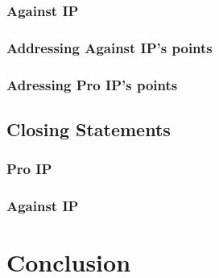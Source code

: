 \documentclass[a4paper]{report}
\begin{document}
\subsection{Against IP}

\subsection{Addressing Against IP's points}

\subsection{Adressing Pro IP's points}

\section{Closing Statements}
\label{sec:ClosStat}

\subsection{Pro IP}

\subsection{Against IP}

\chapter{Conclusion}
\label{ch:Concl}

\newpage

\printbibliography
\end{document}
